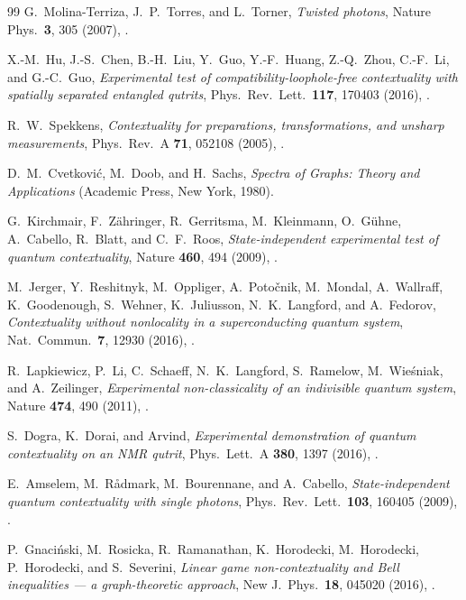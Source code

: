 \documentclass[aps,pra,twocolumn,superscriptaddress,longbibliography,floatfix]{revtex4-2}
\begin{document}
\begin{thebibliography}{99}
G.~Molina-Terriza, J.~P.~Torres, and L.~Torner,
\emph{Twisted photons},
Nature Phys.\ \textbf{3}, 305 (2007),
.

X.-M.~Hu, J.-S.~Chen, B.-H.~Liu, Y.~Guo, Y.-F.~Huang, Z.-Q.~Zhou,
C.-F.~Li, and G.-C.~Guo,
\emph{Experimental test of compatibility-loophole-free contextuality
with spatially separated entangled qutrits},
Phys.\ Rev.\ Lett.\ \textbf{117}, 170403 (2016),
.

R.~W.~Spekkens,
\emph{Contextuality for preparations, transformations, and unsharp
measurements},
Phys.\ Rev.\ A \textbf{71}, 052108 (2005),
.

D.~M.~Cvetkovi\'c, M.~Doob, and H.~Sachs,
\emph{Spectra of Graphs: Theory and Applications}
(Academic Press, New York, 1980).

G.~Kirchmair, F.~Z\"ahringer, R.~Gerritsma, M.~Kleinmann, O.~G\"uhne,
A.~Cabello, R.~Blatt, and C.~F.~Roos,
\emph{State-independent experimental test of quantum contextuality},
Nature \textbf{460}, 494 (2009),
.

M.~Jerger, Y.~Reshitnyk, M.~Oppliger, A.~Poto\v{c}nik, M.~Mondal,
A.~Wallraff, K.~Goodenough, S.~Wehner, K.~Juliusson, N.~K.~Langford,
and A.~Fedorov,
\emph{Contextuality without nonlocality in a superconducting quantum system},
Nat.\ Commun.\ \textbf{7}, 12930 (2016),
.

R.~Lapkiewicz, P.~Li, C.~Schaeff, N.~K.~Langford, S.~Ramelow,
M.~Wie\'{s}niak, and A.~Zeilinger,
\emph{Experimental non-classicality of an indivisible quantum system},
Nature \textbf{474}, 490 (2011),
.

S.~Dogra, K.~Dorai, and Arvind,
\emph{Experimental demonstration of quantum contextuality on an NMR qutrit},
Phys.\ Lett.\ A \textbf{380}, 1397 (2016),
.

E.~Amselem, M.~R{\aa}dmark, M.~Bourennane, and A.~Cabello,
\emph{State-independent quantum contextuality with single photons},
Phys.\ Rev.\ Lett.\ \textbf{103}, 160405 (2009),
.

P.~Gnaci\'nski, M.~Rosicka, R.~Ramanathan, K.~Horodecki,
M.~Horodecki, P.~Horodecki, and S.~Severini,
\emph{Linear game non-contextuality and Bell inequalities --- a
graph-theoretic approach},
New J.\ Phys.\ \textbf{18}, 045020 (2016),
.


\end{thebibliography}
\end{document}
